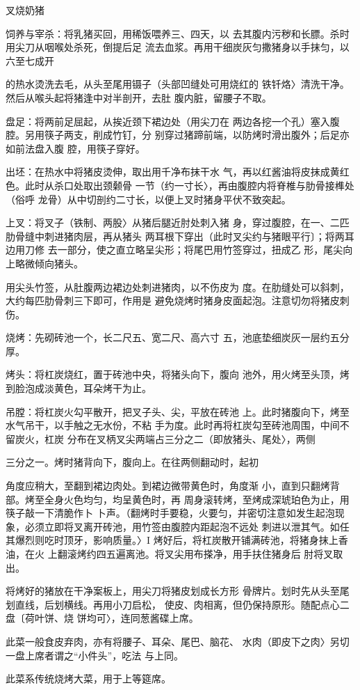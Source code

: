 \begin{recipe}{叉烧奶猪}

\ingredients


\cooking

\step 饲养与宰杀：将乳猪买回，用稀饭喂养三、四天，以 去其腹内污秽和长膘。杀时用尖刀从咽喉处杀死，倒提后足 流去血浆。再用干细炭灰匀撒猪身以手抹匀，以六至七成开

的热水烫洗去毛，从头至尾用镊子（头部凹缝处可用烧红的 铁钎烙〉清洗干净。然后从喉头起将猪逢中对半剖开，去肚 腹内脏，留腰子不取。

\step 	盘足：将两前足屈起，从挨近颈下裙边处（用尖刀在 两边各挖一个孔）塞入腹腔。另用筷子两支，削成竹钉，分 别穿过猪蹄前端，以防烤时滑出腹外；后足亦如前法盘入腹 腔，用筷子穿好。

\step 	出坯：在热水中将猪皮烫伸，取出用千净布抹干水 气，再以红酱油将皮抹成黄红色。此时从杀口处取出颈颡骨 一节（约一寸长〉，再由腹腔内将脊椎与肋骨接榫处（俗呼 龙骨）从中切剖约二寸长，以便上叉时猪身平伏不致突起。

上叉：将叉子（铁制、两股〉从猪后腿近肘处刺入猪 身，穿过腹腔，在一、二匹肋骨缝中刺进猪肉层，再从猪头 两耳根下穿出（此时叉尖约与猪眼平行〕；将两耳边用刀修 去一部分，使之直立略呈尖形；将尾巴用竹签穿过，扭成乙 形，尾尖向上略微倾向猪头。

用尖头竹签，从肚腹两边裙边处刺进猪肉，以不伤皮为 度。在肋缝处可以斜刺，大约每匹肋骨刺三下即可，作用是 避免烧烤时猪身皮面起泡。注意切勿将猪皮刺伤。

\step 烧烤：先砌砖池一个，长二尺五、宽二尺、高六寸 五，池底垫细炭灰一层约五分厚。

\step 烤头：将杠炭烧红，置于砖池中央，将猪头向下，腹向 池外，用火烤至头顶，烤到脸泡成淡黄色，耳朵烤干为止。

\step 吊膛：将杠炭火勾平散开，把叉子头、尖，平放在砖池 上。此时猪腹向下，烤至水气吊干，以手触之无水份，不粘 手为度。此时再将杠炭勾至砖池周围，中间不留炭火，杠炭 分布在叉柄叉尖两端占三分之二（即放猪头、尾处〉，两侧

三分之一。烤时猪背向下，腹向上。在往两侧翻动时，起初

角度应稍大，至翻到裙边肉处。到裙边微带黄色时，角度渐 小，直到只翻烤背部。烤至全身火色均匀，均呈黄色时，再 周身滚转烤，至烤成深琥珀色为止，用筷子敲一下清脆作卜 卜声。（翻烤时手要稳，火要匀，并密切注意如发生起泡现 象，必须立即将叉离开砖池，用竹签由腹腔内距起泡不远处 刺进以泄其气。如任其爆烈则吃时顶牙，影响质量。〉I 烤好后，将杠炭散开铺满砖池，将猪身抹上香油，在火 上翻滚烤约四五遍离池。将叉尖用布搽净，用手扶住猪身后 肘将叉取出。

将烤好的猪放在干净案板上，用尖刀将猪皮划成长方形 骨牌片。划时先从头至尾划直线，后划横线。再用小刀启松， 使皮、肉相离，但仍保持原形。随配点心二盘〔荷叶饼、烧 饼均可〉，连同葱酱碟上席。

此菜一般食皮弃肉，亦有将腰子、耳朵、尾巴、脑花、 水肉（即皮下之肉〉另切一盘上席者谓之“小件头”，吃法 与上同。

\notes

此菜系传统烧烤大菜，用于上等筵席。

\end{recipe}

